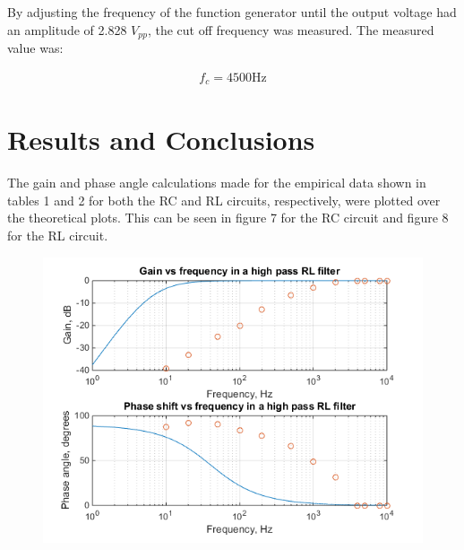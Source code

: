 \documentclass{article}
\begin{document}
By adjusting the frequency of the function generator until the output voltage had an amplitude of 2.828 $\si{V_{pp}}$, the cut off frequency was measured. The measured value was:

\begin{align*}
f_c = 4500 \si{\hertz}
\end{align*}

\newpage



\section{Results and Conclusions}

The gain and phase angle calculations made for the empirical data shown in tables 1 and 2 for both the RC and RL circuits, respectively, were plotted over the theoretical plots. This can be seen in figure 7 for the RC circuit and figure 8 for the RL circuit.

\begin{center}
	\begin{figure}[H]
		\begin{minipage}{0.6\textwidth}
			\includegraphics[scale=0.8]{bode3}
		\end{minipage}
	\end{figure}
\end{center}
\end{document}
